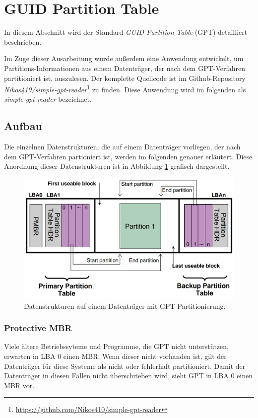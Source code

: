 \section{GUID Partition Table}
\label{sec:structure}
In diesem Abschnitt wird der Standard \textit{GUID Partition Table} (GPT) detailliert beschrieben.

Im Zuge dieser Ausarbeitung wurde außerdem eine Anwendung entwickelt, um Partitions-Informationen aus einem Datenträger, der nach dem GPT-Verfahren partitioniert ist, auszulesen.
Der komplette Quellcode ist im Github-Repository \textit{Nikos410/simple-gpt-reader}\footnote{\url{https://github.com/Nikos410/simple-gpt-reader}} zu finden.
Diese Anwendung wird im folgenden als \textit{simple-gpt-reader} bezeichnet.


\subsection{Aufbau}
Die einzelnen Datenstrukturen, die auf einem Datenträger vorliegen, der nach dem GPT-Verfahren partioniert ist, werden im folgenden genauer erläutert.
Diese Anordnung dieser Datenstrukturen ist in Abbildung \ref{fig:gpt_layout} grafisch dargestellt.

\begin{figure}[ht]
    \includegraphics[width=\textwidth]{content/graphics/GPT_Layout.png}
    \caption{Datenstrukturen auf einem Datenträger mit GPT-Partitionierung. \cite{uefi-spec}}
    \label{fig:gpt_layout}
\end{figure}

\subsubsection{Protective MBR}
Viele ältere Betriebssyteme und Programme, die GPT nicht unterstützen, erwarten in LBA 0 einen MBR.
Wenn dieser nicht vorhanden ist, gilt der Datenträger für diese Systeme als nicht oder fehlerhaft partitioniert.
Damit der Datenträger in diesen Fällen nicht überschrieben wird, sieht GPT in LBA 0 einen MBR vor.

